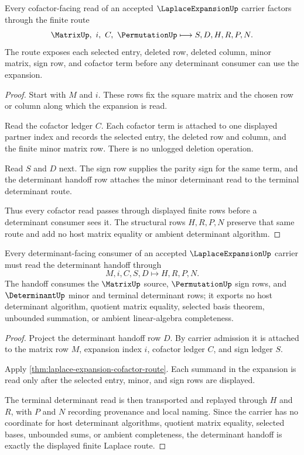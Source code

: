 \begin{theorem}
\label{thm:laplace-expansion-cofactor-route}
Every cofactor-facing read of an accepted $\LaplaceExpansionUp$ carrier factors through the finite route
$$
\MatrixUp,\ i,\ C,\ \PermutationUp
  \longmapsto S,D,H,R,P,N .
$$
The route exposes each selected entry, deleted row, deleted column, minor matrix, sign row, and cofactor term before any determinant consumer can use the expansion.
\end{theorem}
\begin{proof}
Start with $M$ and $i$. These rows fix the square matrix and the chosen row or column along which the expansion is read.

Read the cofactor ledger $C$. Each cofactor term is attached to one displayed partner index and records the selected entry, the deleted row and column, and the finite minor matrix row. There is no unlogged deletion operation.

Read $S$ and $D$ next. The sign row supplies the parity sign for the same term, and the determinant handoff row attaches the minor determinant read to the terminal determinant route.

Thus every cofactor read passes through displayed finite rows before a determinant consumer sees it. The structural rows $H,R,P,N$ preserve that same route and add no host matrix equality or ambient determinant algorithm.
\end{proof}

\begin{theorem}
\label{thm:laplace-expansion-determinant-handoff}
Every determinant-facing consumer of an accepted $\LaplaceExpansionUp$ carrier must read the determinant handoff through
$$
M,i,C,S,D \longmapsto H,R,P,N .
$$
The handoff consumes the $\MatrixUp$ source, $\PermutationUp$ sign rows, and $\DeterminantUp$ minor and terminal determinant rows; it exports no host determinant algorithm, quotient matrix equality, selected basis theorem, unbounded summation, or ambient linear-algebra completeness.
\end{theorem}
\begin{proof}
Project the determinant handoff row $D$. By carrier admission it is attached to the matrix row $M$, expansion index $i$, cofactor ledger $C$, and sign ledger $S$.

Apply \autoref{thm:laplace-expansion-cofactor-route}. Each summand in the expansion is read only after the selected entry, minor, and sign rows are displayed.

The terminal determinant read is then transported and replayed through $H$ and $R$, with $P$ and $N$ recording provenance and local naming. Since the carrier has no coordinate for host determinant algorithms, quotient matrix equality, selected bases, unbounded sums, or ambient completeness, the determinant handoff is exactly the displayed finite Laplace route.
\end{proof}

